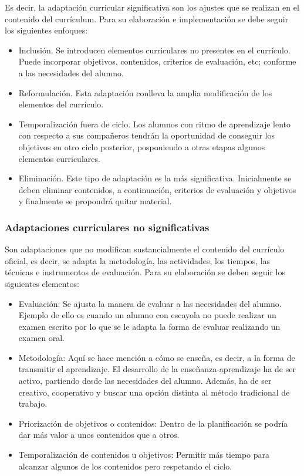Es decir, la adaptación curricular significativa son los ajustes que se realizan en el contenido del currículum. Para su elaboración e implementación se debe seguir los siguientes enfoques:
\begin{itemize}
    \item Inclusión. Se introducen elementos curriculares no presentes en el currículo. Puede incorporar objetivos, contenidos, criterios de evaluación, etc; conforme a las necesidades del alumno.
    \item Reformulación. Esta adaptación conlleva la amplia modificación de los elementos del currículo.
    \item Temporalización fuera de ciclo. Los alumnos con ritmo de aprendizaje lento con respecto a sus compañeros tendrán la oportunidad de conseguir los objetivos en otro ciclo posterior, posponiendo a otras etapas algunos elementos curriculares.
    \item Eliminación. Este tipo de adaptación es la más significativa. Inicialmente se deben eliminar contenidos, a continuación, criterios de evaluación y objetivos y finalmente se propondrá quitar material.
\end{itemize}

\subsubsection{Adaptaciones curriculares no significativas}
Son adaptaciones que no modifican sustancialmente el contenido del currículo oficial, es decir, se adapta la metodología, las actividades, los tiempos, las técnicas e instrumentos de evaluación. Para su elaboración se deben seguir los siguientes elementos:
\begin{itemize}
    \item Evaluación: Se ajusta la manera de evaluar a las necesidades del alumno. Ejemplo de ello es cuando un alumno con escayola no puede realizar un examen escrito por lo que se le adapta la forma de evaluar realizando un examen oral.
    \item Metodología: Aquí se hace mención a cómo se enseña, es decir, a la forma de transmitir el aprendizaje. El desarrollo de la enseñanza-aprendizaje ha de ser activo, partiendo desde las necesidades del alumno. Además, ha de ser creativo, cooperativo y buscar una opción distinta al método tradicional de trabajo.
    \item Priorización de objetivos o contenidos: Dentro de la planificación se podría dar más valor a unos contenidos que a otros.
    \item Temporalización de contenidos u objetivos: Permitir más tiempo para alcanzar algunos de los contenidos pero respetando el ciclo.
\end{itemize}

